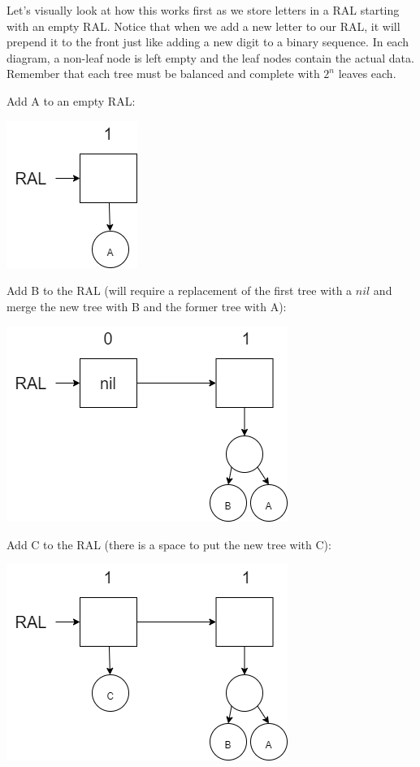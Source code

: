 \documentclass[
]{book}
\begin{document}
Let's visually look at how this works first as we store letters in a RAL starting with an empty RAL. Notice that when we add a new letter to our RAL, it will prepend it to the front just like adding a new digit to a binary sequence. In each diagram, a non-leaf node is left empty and the leaf nodes contain the actual data. Remember that each tree must be balanced and complete with \(2^n\) leaves each.

Add A to an empty RAL:

\includegraphics{images/ral1.drawio.png}

Add B to the RAL (will require a replacement of the first tree with a \(nil\) and merge the new tree with B and the former tree with A):

\includegraphics{images/ral2.drawio.png}

Add C to the RAL (there is a space to put the new tree with C):

\includegraphics{images/ral3.drawio.png}
\end{document}
